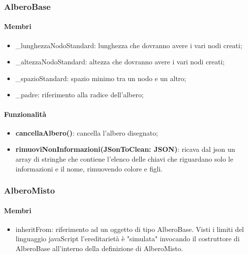 \subsubsection{AlberoBase}
\paragraph{Membri}
\begin{itemize}
\item \_lunghezzaNodoStandard: lunghezza che dovranno avere i vari nodi creati;
\item \_altezzaNodoStandard: altezza che dovranno avere i vari nodi creati;
\item \_spazioStandard: spazio minimo tra un nodo e un altro;
\item \_padre: riferimento alla radice dell'albero;
\end{itemize}
\paragraph{Funzionalità}
\begin{itemize}
\item \textbf{cancellaAlbero()}: cancella l'albero disegnato;
\item \textbf{rimuoviNonInformazioni(JSonToClean: JSON)}: ricava dal json un array di stringhe che contiene l'elenco delle chiavi che riguardano solo le informazioni e il nome, rimuovendo colore e figli.
\end{itemize}
\subsubsection{AlberoMisto}
\paragraph{Membri}
\begin{itemize}
\item inheritFrom: riferimento ad un oggetto di tipo AlberoBase. Visti i limiti del linguaggio javaScript l'ereditarietà è "simulata" invocando il costruttore di AlberoBase all'interno della definizione di AlberoMisto.
\end{itemize}

